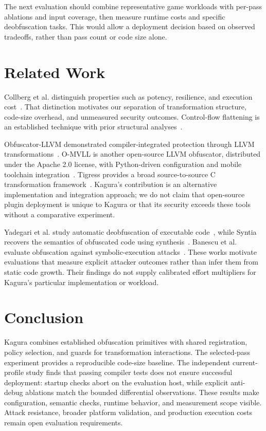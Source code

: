 \documentclass[conference]{IEEEtran}
\begin{document}
The next evaluation should combine representative game workloads with
per-pass ablations and input coverage, then measure runtime costs and
specific deobfuscation tasks. This would allow a deployment decision
based on observed tradeoffs, rather than pass count or code size alone.

\section{Related Work}

Collberg et al. distinguish properties such as potency, resilience,
and execution cost~\cite{collberg1997taxonomy}. That distinction motivates
our separation of transformation structure, code-size overhead, and
unmeasured security outcomes. Control-flow flattening is an established
technique with prior structural analyses~\cite{laszlo2009obfuscating}.

Obfuscator-LLVM demonstrated compiler-integrated protection through
LLVM transformations~\cite{junod2015obfuscator}. O-MVLL is another
open-source LLVM obfuscator, distributed under the Apache 2.0 license,
with Python-driven configuration and mobile toolchain
integration~\cite{omvll}. Tigress provides a broad source-to-source C
transformation framework~\cite{tigress}. Kagura's contribution is an
alternative implementation and integration approach; we do not claim
that open-source plugin deployment is unique to Kagura or that its
security exceeds these tools without a comparative experiment.

Yadegari et al. study automatic deobfuscation of executable
code~\cite{yadegari2015generic}, while Syntia recovers the semantics
of obfuscated code using synthesis~\cite{blazytko2017syntia}.
Banescu et al. evaluate obfuscation against symbolic-execution
attacks~\cite{banescu2016code}. These works motivate evaluations that
measure explicit attacker outcomes rather than infer them from static
code growth. Their findings do not supply calibrated effort multipliers
for Kagura's particular implementation or workload.

\section{Conclusion}

Kagura combines established obfuscation primitives with shared registration,
policy selection, and guards for transformation interactions. The selected-pass
experiment provides a reproducible code-size baseline. The independent
current-profile study finds that passing compiler tests does not ensure
successful deployment: startup checks abort on the evaluation host, while
explicit anti-debug ablations match the bounded differential observations.
These results make configuration, semantic checks, runtime behavior, and
measurement scope visible. Attack resistance, broader platform validation,
and production execution costs remain open evaluation requirements.
\end{document}
